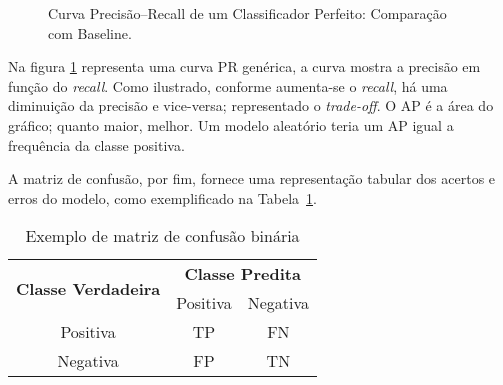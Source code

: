 \begin{figure}[H]
    \centering
    \caption{Curva Precisão–Recall de um Classificador Perfeito: Comparação com Baseline.}
    
    \label{fig:pr_curve_perfect}
\end{figure}


Na figura \ref{fig:pr_curve_perfect} representa uma curva PR genérica, a curva mostra a precisão em função do \textit{recall}. Como ilustrado,
conforme aumenta-se o \textit{recall}, há uma diminuição da precisão e vice-versa; representado o \textit{trade-off}. O AP é a área do gráfico; quanto
maior, melhor. Um modelo aleatório teria um AP igual a frequência da classe positiva.

A matriz de confusão, por fim, fornece uma representação tabular dos acertos e erros do modelo, como exemplificado na Tabela~\ref{tab:matriz_confusao}.

\begin{table}[H]
\centering
\caption{Exemplo de matriz de confusão binária}
\label{tab:matriz_confusao}
\begin{tabular}{|c|c|c|}
\hline
\multirow{2}{*}{\textbf{Classe Verdadeira}} & \multicolumn{2}{c|}{\textbf{Classe Predita}} \\ \cline{2-3} 
 & Positiva & Negativa \\ \hline
Positiva & TP & FN \\ \hline
Negativa & FP & TN \\ \hline
\end{tabular}
\end{table}

